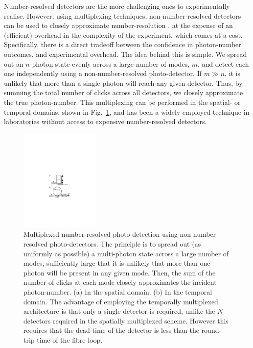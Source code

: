 Number-resolved detectors are the more challenging ones to experimentally realise. However, using multiplexing techniques, non-number-resolved detectors can be used to closely approximate number-resolution \cite{bib:Fitch03, bib:Banaszek03, bib:Achilles04, bib:RohdeCompDet07}, at the expense of an (efficient) overhead in the complexity of the experiment, which comes at a cost. Specifically, there is a direct tradeoff between the confidence in photon-number outcomes, and experimental overhead. The idea behind this is simple. We spread out an $n$-photon state evenly across a large number of modes, $m$, and detect each one independently using a non-number-resolved photo-detector. If \mbox{$m\gg n$}, it is unlikely that more than a single photon will reach any given detector. Thus, by summing the total number of clicks across all detectors, we closely approximate the true photon-number. This multiplexing can be performed in the spatial- or temporal-domains, shown in Fig.~\ref{fig:det_mult}, and has been a widely employed technique in laboratories without access to expensive number-resolved detectors.

\begin{figure}[!htb]
\includegraphics[width=0.35\textwidth]{detector_multiplexing}
\caption{Multiplexed number-resolved photo-detection using non-number-resolved photo-detectors. The principle is to spread out (as uniformly as possible) a multi-photon state across a large number of modes, sufficiently large that it is unlikely that more than one photon will be present in any given mode. Then, the sum of the number of clicks at each mode closely approximates the incident photon-number. (a) In the spatial domain. (b) In the temporal domain. The advantage of employing the temporally multiplexed architecture is that only a single detector is required, unlike the $N$ detectors required in the spatially multiplexed scheme. However this requires that the dead-time of the detector is less than the round-trip time of the fibre loop.} \label{fig:det_mult}
\end{figure}

